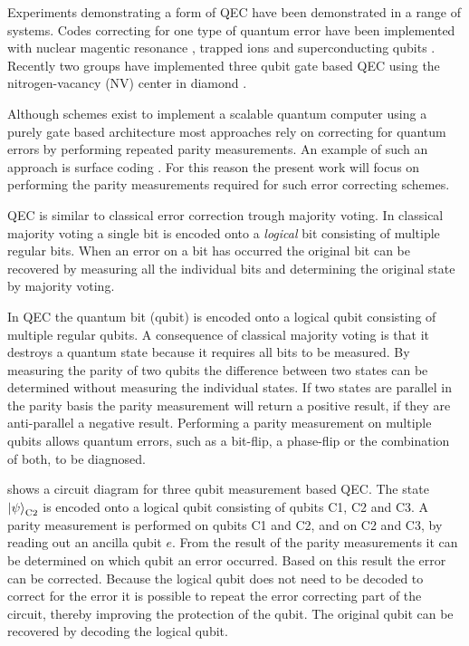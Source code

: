 Experiments demonstrating a form of QEC have been demonstrated in a range of systems.
Codes correcting for one type of quantum error have been implemented with nuclear magentic resonance \citep{Cory1998Experimental,Moussa2011Demonstration}, trapped ions \citep{Schindler2011Experimental}  and superconducting qubits \citep{Reed2012Realization}.
Recently two groups have implemented three qubit gate based QEC using the nitrogen-vacancy (NV) center in diamond \citep{Taminiau2014Universal,Waldherr2014Quantum}.

Although schemes exist to implement a scalable quantum computer using a purely gate based architecture most approaches rely on correcting for quantum errors by performing repeated parity measurements. An example of such an approach is surface coding \citep{Fowler2012Surface}.
For this reason the present work will focus on performing the parity measurements required for such error correcting schemes.

QEC is similar to classical error correction trough majority voting.
In classical majority voting a single bit is encoded onto a \emph{logical} bit consisting of multiple regular bits.
When an error on a bit has occurred the original bit can be recovered by measuring all the individual bits and determining the original state by majority voting.

In QEC the quantum bit (qubit) is encoded onto a logical qubit consisting of multiple regular qubits.
A consequence of classical majority voting is that it destroys a quantum state because it requires all bits to be measured.
By measuring the parity of two qubits the difference between two states can be determined without measuring the individual states.
If two states are parallel in the parity basis the parity measurement will return a positive result, if they are anti-parallel a negative result.
Performing a parity measurement on multiple qubits allows quantum errors, such as a bit-flip, a phase-flip or the combination of both, to be diagnosed.

 shows a circuit diagram for three qubit measurement based QEC.
The state ${\left\vert{\psi}\right\rangle}_\mathrm{C2}$ is encoded onto a logical qubit consisting of qubits C1, C2 and C3.
A parity measurement is performed on qubits C1 and C2, and on C2 and C3,  by reading out an ancilla qubit $e$.
From the result of the parity measurements it can be determined on which qubit an error occurred.
Based on this result the error can be corrected.
Because the logical qubit does not need to be decoded to correct for the error it is possible to repeat the error correcting part of the circuit, thereby improving the protection of the qubit.
The original qubit can be recovered by decoding the logical qubit.

